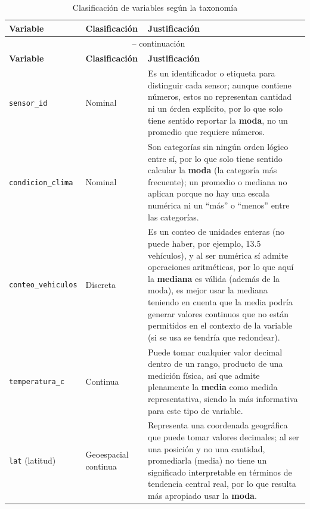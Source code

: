 \documentclass[11pt]{article}
\begin{document}
\begin{longtable}{|p{3.1cm}|p{2.8cm}|p{8.2cm}|}
\caption{Clasificación de variables según la taxonomía} \label{tab:taxonomia_variables} \\
\hline
\textbf{Variable} & \textbf{Clasificación} & \textbf{Justificación} \\
\hline
\endfirsthead

\multicolumn{3}{c}{{\tablename\ \thetable{} -- continuación}} \\
\hline
\textbf{Variable} & \textbf{Clasificación} & \textbf{Justificación} \\
\hline
\endhead

\hline
\endfoot

\hline
\endlastfoot

\renewcommand{\arraystretch}{1.5}

\texttt{sensor\_id} & Nominal &
Es un identificador o etiqueta para distinguir cada sensor; aunque contiene números, estos no representan cantidad ni un órden explícito, por lo que solo tiene sentido reportar la \textbf{moda}, no un promedio que requiere números. \\
\hline
\texttt{condicion\_clima} & Nominal &
Son categorías sin ningún orden lógico entre sí, por lo que solo tiene sentido calcular la \textbf{moda} (la categoría más frecuente); un promedio o mediana no aplican porque no hay una escala numérica ni un ``más'' o ``menos'' entre las categorías. \\
\hline
\texttt{conteo\_vehiculos} & Discreta &
Es un conteo de unidades enteras (no puede haber, por ejemplo, 13.5 vehículos), y al ser numérica sí admite operaciones aritméticas, por lo que aquí la \textbf{mediana} es válida (además de la moda), es mejor usar la mediana teniendo en cuenta que la media podría generar valores continuos que no están permitidos en el contexto de la variable (si se usa se tendría que redondear). \\
\hline
\texttt{temperatura\_c} & Continua &
Puede tomar cualquier valor decimal dentro de un rango, producto de una medición física, así que admite plenamente la \textbf{media} como medida representativa, siendo la más informativa para este tipo de variable. \\
\hline
\texttt{lat} (latitud) & Geoespacial continua &
Representa una coordenada geográfica que puede tomar valores decimales; al ser una posición y no una cantidad, promediarla (media) no tiene un significado interpretable en términos de tendencia central real, por lo que resulta más apropiado usar la \textbf{moda}. \\
\hline
\end{longtable}
\end{document}
